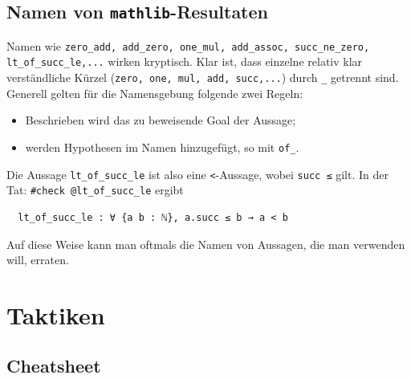 \documentclass[11pt]{article}
\newcommand{\leanin}{\texttt}
\newcommand{\leanstate}{\texttt}
\newcommand{\leantable}[1]{
  \noindent
  \begin{tabular}{|p{0.36\textwidth}|p{0.28\textwidth}|p{0.3\textwidth}|}     \hline
    \vphantom{$\displaystyle\int$}
    \bf Proof state & \bf Kommando & \bf Neuer proof state \\ \hline \hline 
    #1
    \hline
  \end{tabular}
}
\newcommand{\intro}{    \leanstate{⊢ P → Q} & \leanin{intro hP} & \leanstate{hP : P} \\ && \leanstate{⊢ Q} \\ \hline \leanstate{f : α → Prop} & \leanin{intro x,} & \leanstate{f: α → Prop} \\  \leanstate{⊢ ∀ (x : α), f x} & & \leanstate{x : α} \\ && \leanstate{⊢ f x} \\}
\newcommand{\triv}{\leanstate{⊢ true} & \leanin{triv,} & \bf{goals accomplished \emoji{party-popper}} \\ }
\begin{document}
\subsection{Namen von \leanstate{mathlib}-Resultaten}
Namen wie \leanstate{zero_add, add_zero, one_mul, add_assoc, succ_ne_zero, lt_of_succ_le,...} wirken kryptisch. Klar ist, dass einzelne relativ klar verständliche Kürzel (\leanstate{zero, one, mul, add, succ,...}) durch \leanstate{_} getrennt sind. Generell gelten für die Namensgebung folgende zwei Regeln:
\begin{itemize}
\item Beschrieben wird das zu beweisende Goal der Aussage; 
\item werden Hypothesen im Namen hinzugefügt, so mit \leanstate{of_}.
\end{itemize}
Die Aussage \leanstate{lt_of_succ_le} ist also eine \leanstate{<}-Aussage, wobei \leanstate{succ ≤} gilt. In der Tat: \leanin{#check @lt_of_succ_le} ergibt
\begin{verbatim}
  lt_of_succ_le : ∀ {a b : ℕ}, a.succ ≤ b → a < b
\end{verbatim}
Auf diese Weise kann man oftmals die Namen von Aussagen, die man verwenden will, erraten.







\newpage

\section{Taktiken}
\label{S:tactics}

\subsection{Cheatsheet}

\end{document}
